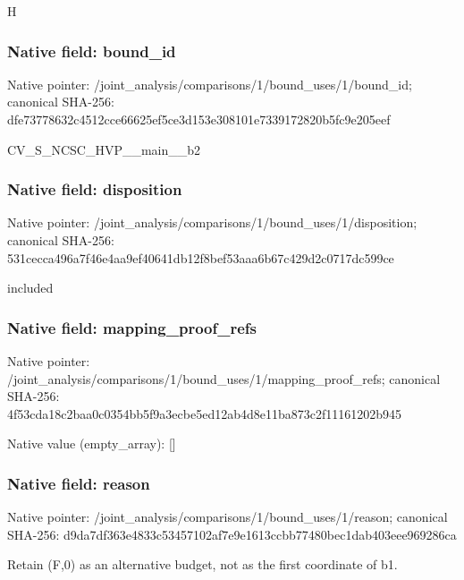 \documentclass[10pt,a4paper]{article}
\begin{document}
\begingroup\raggedright\sloppy H\par\endgroup

\subsubsection{Native field: bound\_\allowbreak{}id}
Native pointer: /joint\_\allowbreak{}analysis/comparisons/1/bound\_\allowbreak{}uses/1/bound\_\allowbreak{}id; canonical SHA-256: dfe73778632c4512cce66625ef5ce3d153e308101e7339172820b5fc9e205eef

\begingroup\raggedright\sloppy CV\_\allowbreak{}S\_\allowbreak{}NCSC\_\allowbreak{}HVP\_\allowbreak{}\_\allowbreak{}main\_\allowbreak{}\_\allowbreak{}b2\par\endgroup

\subsubsection{Native field: disposition}
Native pointer: /joint\_\allowbreak{}analysis/comparisons/1/bound\_\allowbreak{}uses/1/disposition; canonical SHA-256: 531cecca496a7f46e4aa9ef40641db12f8bef53aaa6b67c429d2c0717dc599ce

\begingroup\raggedright\sloppy included\par\endgroup

\subsubsection{Native field: mapping\_\allowbreak{}proof\_\allowbreak{}refs}
Native pointer: /joint\_\allowbreak{}analysis/comparisons/1/bound\_\allowbreak{}uses/1/mapping\_\allowbreak{}proof\_\allowbreak{}refs; canonical SHA-256: 4f53cda18c2baa0c0354bb5f9a3ecbe5ed12ab4d8e11ba873c2f11161202b945

Native value (empty\_\allowbreak{}array): []

\subsubsection{Native field: reason}
Native pointer: /joint\_\allowbreak{}analysis/comparisons/1/bound\_\allowbreak{}uses/1/reason; canonical SHA-256: d9da7df363e4833c53457102af7e9e1613ccbb77480bec1dab403eee969286ca

\begingroup\raggedright\sloppy Retain (F,\allowbreak{}0) as an alternative budget,\allowbreak{} not as the first coordinate of b1.\par\endgroup
\end{document}
